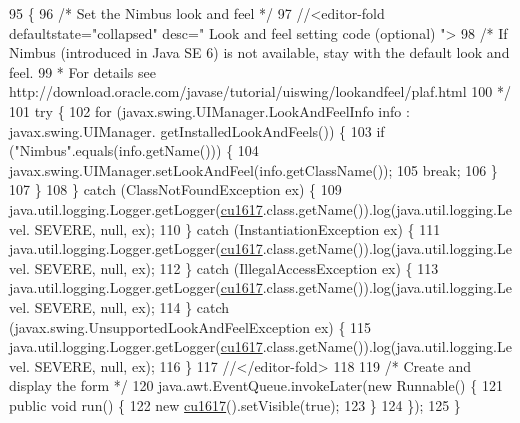 \begin{DoxyCode}
95                                            \{
96         \textcolor{comment}{/* Set the Nimbus look and feel */}
97         \textcolor{comment}{//<editor-fold defaultstate="collapsed" desc=" Look and feel setting code (optional) ">}
98         \textcolor{comment}{/* If Nimbus (introduced in Java SE 6) is not available, stay with the default look and feel.}
99 \textcolor{comment}{         * For details see http://download.oracle.com/javase/tutorial/uiswing/lookandfeel/plaf.html }
100 \textcolor{comment}{         */}
101         \textcolor{keywordflow}{try} \{
102             \textcolor{keywordflow}{for} (javax.swing.UIManager.LookAndFeelInfo info : javax.swing.UIManager.
      getInstalledLookAndFeels()) \{
103                 \textcolor{keywordflow}{if} (\textcolor{stringliteral}{"Nimbus"}.equals(info.getName())) \{
104                     javax.swing.UIManager.setLookAndFeel(info.getClassName());
105                     \textcolor{keywordflow}{break};
106                 \}
107             \}
108         \} \textcolor{keywordflow}{catch} (ClassNotFoundException ex) \{
109             java.util.logging.Logger.getLogger(\mbox{\hyperlink{classinterfacessoguar_1_1cu1617_a372c757ba474fc10b267c6722f3a6f1c}{cu1617}}.class.getName()).log(java.util.logging.Level.
      SEVERE, null, ex);
110         \} \textcolor{keywordflow}{catch} (InstantiationException ex) \{
111             java.util.logging.Logger.getLogger(\mbox{\hyperlink{classinterfacessoguar_1_1cu1617_a372c757ba474fc10b267c6722f3a6f1c}{cu1617}}.class.getName()).log(java.util.logging.Level.
      SEVERE, null, ex);
112         \} \textcolor{keywordflow}{catch} (IllegalAccessException ex) \{
113             java.util.logging.Logger.getLogger(\mbox{\hyperlink{classinterfacessoguar_1_1cu1617_a372c757ba474fc10b267c6722f3a6f1c}{cu1617}}.class.getName()).log(java.util.logging.Level.
      SEVERE, null, ex);
114         \} \textcolor{keywordflow}{catch} (javax.swing.UnsupportedLookAndFeelException ex) \{
115             java.util.logging.Logger.getLogger(\mbox{\hyperlink{classinterfacessoguar_1_1cu1617_a372c757ba474fc10b267c6722f3a6f1c}{cu1617}}.class.getName()).log(java.util.logging.Level.
      SEVERE, null, ex);
116         \}
117         \textcolor{comment}{//</editor-fold>}
118 
119         \textcolor{comment}{/* Create and display the form */}
120         java.awt.EventQueue.invokeLater(\textcolor{keyword}{new} Runnable() \{
121             \textcolor{keyword}{public} \textcolor{keywordtype}{void} run() \{
122                 \textcolor{keyword}{new} \mbox{\hyperlink{classinterfacessoguar_1_1cu1617_a372c757ba474fc10b267c6722f3a6f1c}{cu1617}}().setVisible(\textcolor{keyword}{true});
123             \}
124         \});
125     \}
\end{DoxyCode}


